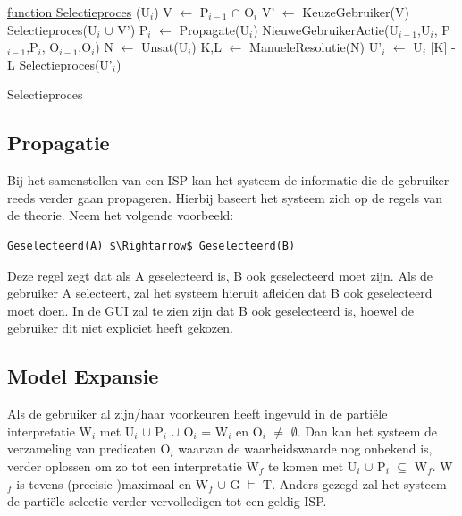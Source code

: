 \begin{algorithm}
	\underline{function Selectieproces} (U$_{i}$)\;
	\Output{}
		{
		V $\leftarrow$ P$_{i-1}$ $\cap$ O$_{i}$\;
			{
			V' $\leftarrow$ KeuzeGebruiker(V)\; 
			Selectieproces(U$_{i}$ $\cup$ V')\;
			}
			{
			P$_{i}$ $\leftarrow$ Propagate(U$_{i}$)\;	
			NieuweGebruikerActie(U$_{i-1}$,U$_{i}$,
			P$_{i-1}$,P$_{i}$,
			O$_{i-1}$,O$_{i}$)\;
			}
		}
		{
		N $\leftarrow$ Unsat(U$_{i}$)\; 
		K,L $\leftarrow$ ManueleResolutie(N)\;
		U'$_{i}$ $\leftarrow$ U$_{i}$ 
		[K] - L\; 
		Selectieproces(U'$_{i}$)\;
		}
	\caption{Selectieproces}
\end{algorithm}

\subsection{Propagatie}
Bij het samenstellen van een ISP kan het systeem de informatie die de gebruiker reeds verder gaan propageren. Hierbij baseert het systeem zich op de regels van de theorie. Neem het volgende voorbeeld: 
\begin{lstlisting}[mathescape]
Geselecteerd(A) $\Rightarrow$ Geselecteerd(B)
\end{lstlisting}
Deze regel zegt dat als A geselecteerd is, B ook geselecteerd moet zijn. Als de gebruiker A selecteert, zal het systeem hieruit afleiden dat B ook geselecteerd moet doen. In de GUI zal te zien zijn dat B ook geselecteerd is, hoewel de gebruiker dit niet expliciet heeft gekozen.

\subsection{Model Expansie}
Als de gebruiker al zijn/haar voorkeuren heeft ingevuld in de parti\"{e}le interpretatie W$_{i}$ met U$_{i}$ $\cup$ P$_{i}$ $\cup$ O$_{i}$ = W$_{i}$ en O$_{i}$ $\neq$ $\emptyset$. Dan kan het systeem de verzameling van predicaten O$_{i}$ waarvan de waarheidswaarde nog onbekend is, verder oplossen om zo tot een interpretatie W$_{f}$ te komen met U$_{i}$ $\cup$ P$_{i}$ $\subseteq$ W$_{f}$. W$_{f}$ is tevens (precisie )maximaal en W$_{f}$ $\cup$ G $\models$ T. Anders gezegd zal het systeem de parti\"{e}le selectie verder vervolledigen tot een geldig ISP. 

